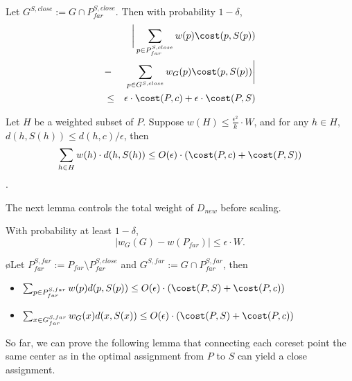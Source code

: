 \begin{lemma} \label{lemma:close}
Let $G^{S,close}:=G\cap P_{far}^{S,close}$. Then with probability $1-\delta$,
\begin{eqnarray*}
&&\bigg{|}\sum_{p\in P_{far}^{S,close}}w(p)\cost(p,S(p))\\&-&\sum_{p\in G^{S,close}}w_G(p)\cost(p,S(p))\bigg{|}\\
&\leq& \epsilon\cdot \cost(P,c)+\epsilon\cdot \cost(P,S)
\end{eqnarray*}
\end{lemma}





\begin{lemma} \label{lemma:controlfar}
Let $H$ be a weighted subset of $P$. Suppose $w(H)\leq \frac{\epsilon^2}{k}\cdot W$, and for any $h\in H$, $d(h,S(h))
\leq d(h,c)/\epsilon$, then $$\sum_{h\in H} w(h)\cdot d(h,S(h))\leq O(\epsilon) \cdot (\cost(P,c)+\cost(P,S))$$.
\end{lemma}


The next lemma controls the total weight of $D_{new}$ before scaling.

\begin{lemma} \label{lemma:weight}
With probability at least $1-\delta$,
$$
|w_G(G)-w(P_{far})|\leq \epsilon\cdot W.
$$
\end{lemma}

\begin{lemma} \label{lemma:far}
øLet $P_{far}^{S,far}:=P_{far}\setminus P_{far}^{S,close}$ and $G^{S,far}:=G\cap P_{far}^{S,far}$, then 
\begin{itemize}
    \item $\sum_{p\in P_{far}^{S,far}} w(p)d(p,S(p)) \leq O(\epsilon)\cdot (\cost(P,S)+\cost(P,c))$
    \item  $\sum_{x\in G_{far}^{S,far}} w_G(x)d(x,S(x)) \leq O(\epsilon)\cdot (\cost(P,S)+\cost(P,c))$
\end{itemize}


\end{lemma}



So far, we can prove the following lemma that connecting each coreset point the same center as in the optimal assignment from $P$ to $S$ can yield a close assignment. 

